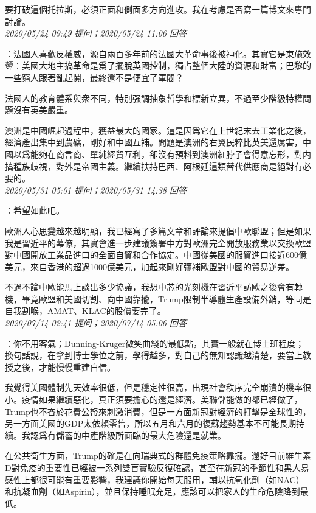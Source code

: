 \documentclass[twocolumn]{ctexart}
\begin{document}
要打破這個托拉斯，必須正面和側面多方向進攻。我在考慮是否寫一篇博文來專門討論。
\\

\textit{\hfill\noindent\small 2020/05/24 09:49 提问；2020/05/24 11:06 回答}

：法國人喜歡反權威，源自兩百多年前的法國大革命事後被神化。其實它是東施效顰：美國大地主搞革命是爲了擺脫英國控制，獨占整個大陸的資源和財富；巴黎的一些窮人跟著亂起鬨，最終還不是便宜了軍閥？

法國人的教育體系與衆不同，特別强調抽象哲學和標新立異，不過至少階級特權問題沒有英美嚴重。

澳洲是中國崛起過程中，獲益最大的國家。這是因爲它在上世紀末去工業化之後，經濟產出集中到農礦，剛好和中國互補。問題是澳洲的右翼民粹比英美還厲害，中國以爲能夠在商言商、單純經貿互利，卻沒有預料到澳洲紅脖子會得意忘形，對内搞種族歧視，對外是帝國主義。繼續扶持巴西、阿根廷這類替代供應商是絕對有必要的。
\\

\textit{\hfill\noindent\small 2020/05/31 05:01 提问；2020/05/31 14:38 回答}

：希望如此吧。

歐洲人心思變越來越明顯，我已經寫了多篇文章和評論來提倡中歐聯盟；但是如果我是習近平的幕僚，其實會進一步建議簽署中方對歐洲完全開放服務業以交換歐盟對中國開放工業品進口的全面自貿和合作協定。中國從美國的服貿進口接近600億美元，來自香港的超過1000億美元，加起來剛好彌補歐盟對中國的貿易逆差。

不過不論中歐能馬上談出多少協議，我想中芯的光刻機在習近平訪歐之後會有轉機，畢竟歐盟和美國切割、向中國靠攏，Trump限制半導體生產設備外銷，等同是自我割喉，AMAT、KLAC的股價要完了。
\\

\textit{\hfill\noindent\small 2020/07/14 02:41 提问；2020/07/14 05:06 回答}

：你不用客氣；Dunning-Kruger微笑曲綫的最低點，其實一般就在博士班程度；換句話說，在拿到博士學位之前，學得越多，對自己的無知認識越清楚，要當上教授之後，才能慢慢重建自信。

我覺得美國體制先天效率很低，但是穩定性很高，出現社會秩序完全崩潰的機率很小。疫情如果繼續惡化，真正須要擔心的還是經濟。美聯儲能做的都已經做了，Trump也不吝於花費公帑來刺激消費，但是一方面新冠對經濟的打擊是全球性的，另一方面美國的GDP太依賴零售，所以五月和六月的復蘇趨勢基本不可能長期持續。我認爲有儲蓄的中產階級所面臨的最大危險還是就業。

在公共衛生方面，Trump的確是在向瑞典式的群體免疫策略靠攏。還好目前維生素D對免疫的重要性已經被一系列雙盲實驗反復確認，甚至在新冠的季節性和黑人易感性上都很可能有重要影響，我建議你開始每天服用，輔以抗氧化劑（如NAC）和抗凝血劑（如Aspirin），並且保持睡眠充足，應該可以把家人的生命危險降到最低。
\end{document}
